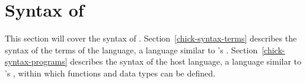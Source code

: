 \section{Syntax of \Chick{}}

This section will cover the syntax of \Chick{}.
Section~\ref{chick-syntax-terms} describes the syntax of the terms of the
language, a language similar to \Coq{}'s \Gallina{}.
Section~\ref{chick-syntax-programs} describes the syntax of the host language, a
language similar to \Coq{}'s \Vernacular{}, within which functions and data
types can be defined.




